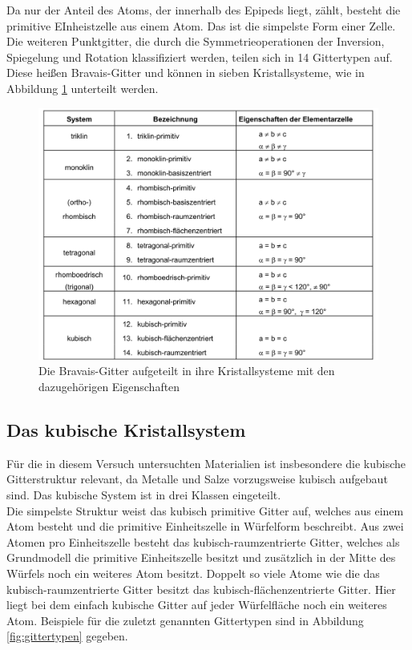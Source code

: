Da nur der Anteil des Atoms, der innerhalb des Epipeds liegt, zählt, besteht die primitive EInheistzelle aus einem Atom.
Das ist die simpelste Form einer Zelle. 
Die weiteren Punktgitter, die durch die Symmetrieoperationen der Inversion, Spiegelung und Rotation klassifiziert werden, teilen sich in 14 Gittertypen auf. 
Diese heißen Bravais-Gitter und können in sieben Kristallsysteme, wie in Abbildung \ref{fig:System} unterteilt werden.
\begin{figure}
	\centering
	\includegraphics[width = \textwidth]{Abbildungen/System.png}
	\caption{Die Bravais-Gitter aufgeteilt in ihre Kristallsysteme mit den dazugehörigen Eigenschaften \cite{Anleitung}}
	\label{fig:System}
\end{figure} 
\subsection{Das kubische Kristallsystem}
Für die in diesem Versuch untersuchten Materialien ist insbesondere die kubische Gitterstruktur relevant, da Metalle und Salze vorzugsweise kubisch aufgebaut sind.
Das kubische System ist in drei Klassen eingeteilt.\\
Die simpelste Struktur weist das kubisch primitive Gitter auf, welches aus einem Atom besteht und die primitive Einheitszelle in Würfelform beschreibt.
Aus zwei Atomen pro Einheitszelle besteht das kubisch-raumzentrierte Gitter, welches als Grundmodell die primitive Einheitszelle besitzt und zusätzlich in der Mitte des Würfels noch ein weiteres Atom besitzt.
Doppelt so viele Atome wie die das kubisch-raumzentrierte Gitter besitzt das kubisch-flächenzentrierte Gitter.
Hier liegt bei dem einfach kubische Gitter auf jeder Würfelfläche noch ein weiteres Atom.
Beispiele für die zuletzt genannten Gittertypen sind in Abbildung \ref{fig:gittertypen} gegeben.

